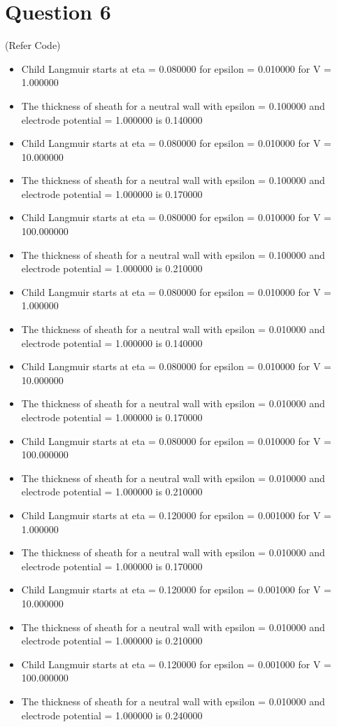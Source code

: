 \documentclass[11pt, a4paper]{article}
\begin{document}
\section{Question 6}
(Refer Code)
\begin{itemize}
 \item Child Langmuir starts at eta = 0.080000 for epsilon = 0.010000 for V = 1.000000
  \item The thickness of sheath for a neutral wall with epsilon = 0.100000 and electrode potential = 1.000000 is 0.140000
  \item Child Langmuir starts at eta = 0.080000 for epsilon = 0.010000 for V = 10.000000
  \item The thickness of sheath for a neutral wall with epsilon = 0.100000 and electrode potential = 1.000000 is 0.170000
  \item Child Langmuir starts at eta = 0.080000 for epsilon = 0.010000 for V = 100.000000
  \item The thickness of sheath for a neutral wall with epsilon = 0.100000 and electrode potential = 1.000000 is 0.210000
  \item Child Langmuir starts at eta = 0.080000 for epsilon = 0.010000 for V = 1.000000
  \item The thickness of sheath for a neutral wall with epsilon = 0.010000 and electrode potential = 1.000000 is 0.140000
  \item Child Langmuir starts at eta = 0.080000 for epsilon = 0.010000 for V = 10.000000
  \item The thickness of sheath for a neutral wall with epsilon = 0.010000 and electrode potential = 1.000000 is 0.170000
  \item Child Langmuir starts at eta = 0.080000 for epsilon = 0.010000 for V = 100.000000
  \item The thickness of sheath for a neutral wall with epsilon = 0.010000 and electrode potential = 1.000000 is 0.210000
  \item Child Langmuir starts at eta = 0.120000 for epsilon = 0.001000 for V = 1.000000
  \item The thickness of sheath for a neutral wall with epsilon = 0.010000 and electrode potential = 1.000000 is 0.170000
  \item Child Langmuir starts at eta = 0.120000 for epsilon = 0.001000 for V = 10.000000
  \item The thickness of sheath for a neutral wall with epsilon = 0.010000 and electrode potential = 1.000000 is 0.210000
  \item Child Langmuir starts at eta = 0.120000 for epsilon = 0.001000 for V = 100.000000
  \item The thickness of sheath for a neutral wall with epsilon = 0.010000 and electrode potential = 1.000000 is 0.240000

\end{itemize}
\end{document}
